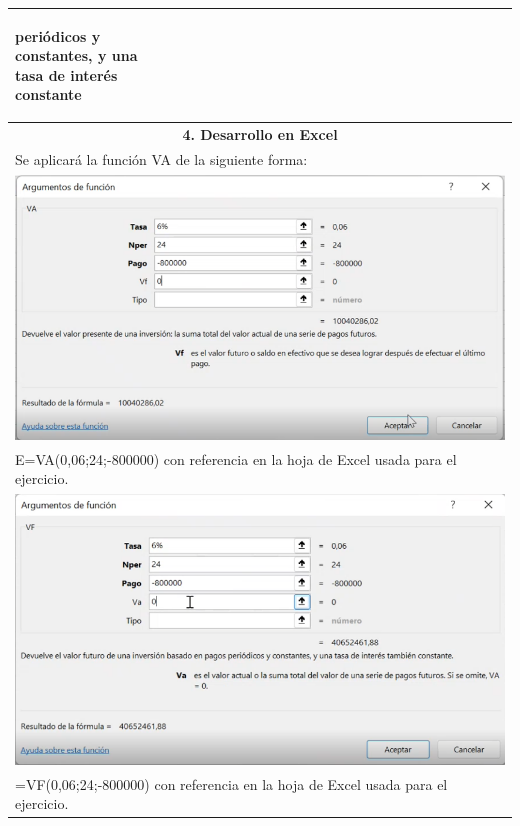 \begin{center}
\begin{longtable}[H]{|p{0.333\linewidth}|p{0.3333\linewidth}|p{0.3333\linewidth}|}
{\begin{itemize}
         periódicos y constantes, y una tasa de interés constante
  \end{itemize}
  }                                                                                                                   \\ \hline
  \multicolumn{3}{|c|}{\cellcolor[HTML]{FFB183}\textbf{4. Desarrollo en Excel}}                                       \\ \hline
  \multicolumn{3}{|l|}{Se aplicará la función VA de la siguiente forma:}                                              \\
  \multicolumn{3}{|c|}{ \includegraphics[trim=-5 -5 -5 -5 ,width=1\columnwidth]{4/Ejem4.1.png}}                        \\
  \multicolumn{3}{|l|}{E=VA(0,06;24;-800000) con referencia en la hoja de Excel usada para el ejercicio.}             \\
  \multicolumn{3}{|c|}{ \includegraphics[trim=-5 -5 -5 -5 ,width=1\columnwidth]{4/Ejem4.2.png}}                        \\
  \multicolumn{3}{|l|}{ =VF(0,06;24;-800000) con referencia en la hoja de Excel usada para el ejercicio.}             \\ \hline

\end{longtable}
\end{center}
